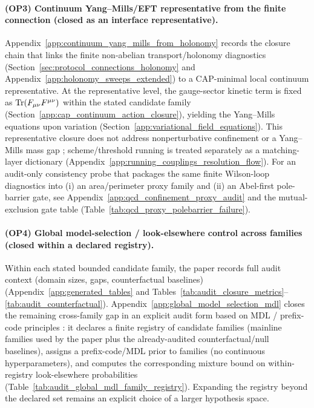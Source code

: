\paragraph{(OP3) Continuum Yang--Mills/EFT representative from the finite connection (closed as an interface representative).}
Appendix~\ref{app:continuum_yang_mills_from_holonomy} records the closure chain that links the finite non-abelian transport/holonomy diagnostics (Section~\ref{sec:protocol_connections_holonomy} and Appendix~\ref{app:holonomy_sweeps_extended}) to a CAP-minimal local continuum representative.
At the representative level, the gauge-sector kinetic term is fixed as $\mathrm{Tr}(F_{\mu\nu}F^{\mu\nu})$ within the stated candidate family (Section~\ref{app:cap_continuum_action_closure}), yielding the Yang--Mills equations upon variation (Section~\ref{app:variational_field_equations}).
This representative closure does not address nonperturbative confinement or a Yang--Mills mass gap \cite{JaffeWitten2000YangMillsMassGap,Greensite2011Confinement}; scheme/threshold running is treated separately as a matching-layer dictionary (Appendix~\ref{app:running_couplings_resolution_flow}).
\AuditTag For an audit-only consistency probe that packages the same finite Wilson-loop diagnostics into (i) an area/perimeter proxy family and (ii) an Abel-first pole-barrier gate, see Appendix~\ref{app:qcd_confinement_proxy_audit} and the mutual-exclusion gate table (Table~\ref{tab:qcd_proxy_polebarrier_failure}).

\paragraph{(OP4) Global model-selection / look-elsewhere control across families (closed within a declared registry).}
Within each stated bounded candidate family, the paper records full audit context (domain sizes, gaps, counterfactual baselines)
(Appendix~\ref{app:generated_tables} and Tables~\ref{tab:audit_closure_metrics}--\ref{tab:audit_counterfactual}).
Appendix~\ref{app:global_model_selection_mdl} closes the remaining cross-family gap in an explicit audit form based on MDL / prefix-code principles \cite{Rissanen1978MDL,HansenYu2001MDL}:
it declares a finite registry of candidate families (mainline families used by the paper plus the already-audited counterfactual/null baselines),
assigns a prefix-code/MDL prior to families (no continuous hyperparameters), and computes the corresponding mixture bound on within-registry look-elsewhere probabilities (Table~\ref{tab:audit_global_mdl_family_registry}).
Expanding the registry beyond the declared set remains an explicit choice of a larger hypothesis space.

